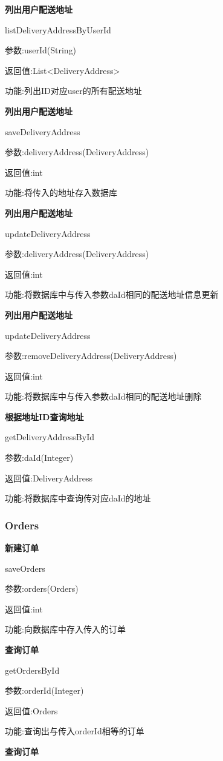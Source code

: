 \textbf{列出用户配送地址}

listDeliveryAddressByUserId

参数:userId(String)

返回值:List<DeliveryAddress>

功能:列出ID对应user的所有配送地址

\textbf{列出用户配送地址}

saveDeliveryAddress

参数:deliveryAddress(DeliveryAddress)

返回值:int

功能:将传入的地址存入数据库

\textbf{列出用户配送地址}

updateDeliveryAddress

参数:deliveryAddress(DeliveryAddress)

返回值:int

功能:将数据库中与传入参数daId相同的配送地址信息更新


\textbf{列出用户配送地址}

updateDeliveryAddress

参数:removeDeliveryAddress(DeliveryAddress)

返回值:int

功能:将数据库中与传入参数daId相同的配送地址删除

\textbf{根据地址ID查询地址}

getDeliveryAddressById

参数:daId(Integer)

返回值:DeliveryAddress

功能:将数据库中查询传对应daId的地址

\subsubsection{Orders}

\textbf{新建订单}

saveOrders

参数:orders(Orders)

返回值:int

功能:向数据库中存入传入的订单

\textbf{查询订单}

getOrdersById

参数:orderId(Integer)

返回值:Orders

功能:查询出与传入orderId相等的订单

\textbf{查询订单}

